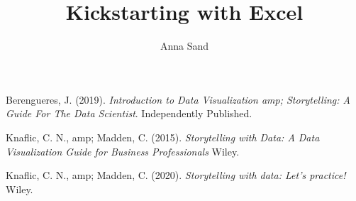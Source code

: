 \documentclass{article}
\title{Kickstarting with Excel}
\author{Anna Sand}
\date{ }
\begin{document}
\maketitle

\begin{thebibliography}{3}
  Berengueres, J. (2019). \emph{Introduction to Data Visualization amp; Storytelling: A Guide For The Data Scientist}. Independently Published. 
 
  Knaflic, C. N., amp; Madden, C. (2015). \emph{Storytelling with Data: A Data Visualization Guide for Business Professionals} Wiley. 
 
 Knaflic, C. N., amp; Madden, C. (2020). \emph{Storytelling with data: Let's practice!} Wiley. 
\end{thebibliography}
\end{document}
